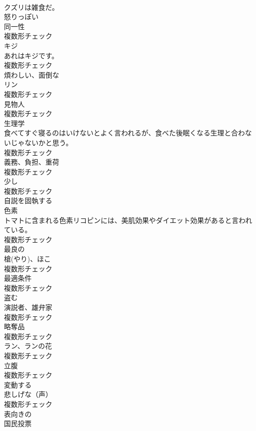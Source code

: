 \documentclass[8pt]{extreport}
\begin{document}
\begin{CJK}{UTF8}{min}
\\	クズリは雑食だ。	
\\	[形容詞]	怒りっぽい	
\\	[名詞]	同一性	
\\	複数形チェック
\\	[名詞]	キジ	
\\	あれはキジです。	
\\	複数形チェック
\\	[形容詞]	煩わしい、面倒な	
\\	[名詞]	リン	
\\	複数形チェック
\\	[名詞]	見物人	
\\	複数形チェック
\\	[名詞]	生理学	
\\	食べてすぐ寝るのはいけないとよく言われるが、食べた後眠くなる生理と合わないじゃないかと思う。	
\\	複数形チェック
\\	[名詞]	義務、負担、重荷	
\\	複数形チェック
\\	[名詞]	少し	
\\	複数形チェック
\\	[形容詞]	自説を固執する	
\\	[名詞]	色素	
\\	トマトに含まれる色素リコピンには、美肌効果やダイエット効果があると言われている。	
\\	複数形チェック
\\	[形容詞]	最良の	
\\	[名詞]	槍(やり)、ほこ	
\\	複数形チェック
\\	[名詞]	最適条件	
\\	複数形チェック
\\	[動詞]	盗む	
\\	[名詞]	演説者、雄弁家	
\\	複数形チェック
\\	[名詞]	略奪品	
\\	複数形チェック
\\	[名詞]	ラン、ランの花	
\\	複数形チェック
\\	[名詞]	立腹	
\\	複数形チェック
\\	[動詞]	変動する	
\\	[名詞]	悲しげな（声）	
\\	複数形チェック
\\	[形容詞]	表向きの	
\\	[名詞]	国⺠投票	

\end{CJK}
\end{document}
